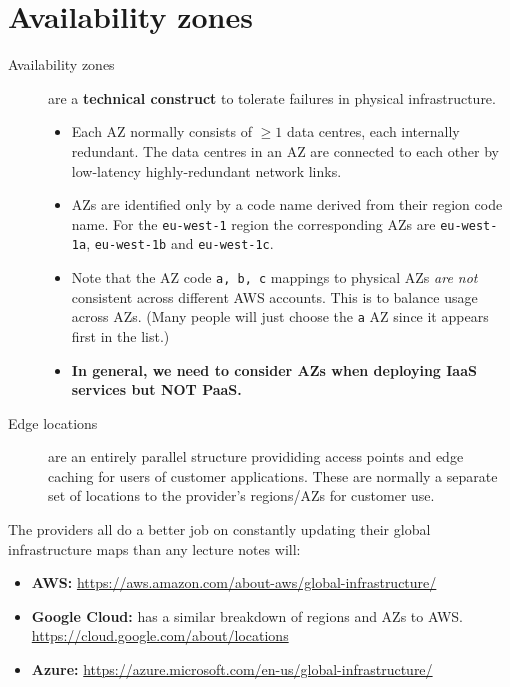 \section{Availability zones}
\label{sec:availability-zones}

\begin{description}

\item[Availability zones]
are a \textbf{technical construct} to tolerate failures in physical
infrastructure.

\begin{itemize}
\item
  Each AZ normally consists of \(\ge 1\) data centres, each internally
  redundant. The data centres in an AZ are connected to each other by
  low-latency highly-redundant network links.
\item
  AZs are identified only by a code name derived from their region code
  name. For the \texttt{eu-west-1} region the corresponding AZs are
  \texttt{eu-west-1a}, \texttt{eu-west-1b} and \texttt{eu-west-1c}.
\item
  Note that the AZ code \texttt{a,\ b,\ c} mappings to physical AZs
  \emph{are not} consistent across different AWS accounts. This is to
  balance usage across AZs. (Many people will just choose the \texttt{a}
  AZ since it appears first in the list.)
\item
  \textbf{In general, we need to consider AZs when deploying IaaS
  services but NOT PaaS.}
\end{itemize}
\item[Edge locations]
are an entirely parallel structure provididing access points and edge
caching for users of customer applications. These are normally a
separate set of locations to the provider's regions/AZs for customer
use.
\end{description}

The providers all do a better job on constantly updating their global
infrastructure maps than any lecture notes will:

\begin{itemize}
\item
  \textbf{AWS:}
  \url{https://aws.amazon.com/about-aws/global-infrastructure/}
\item
  \textbf{Google Cloud:} has a similar breakdown of regions and AZs to
  AWS. \url{https://cloud.google.com/about/locations}
\item
  \textbf{Azure:}
  \url{https://azure.microsoft.com/en-us/global-infrastructure/}
\end{itemize}
